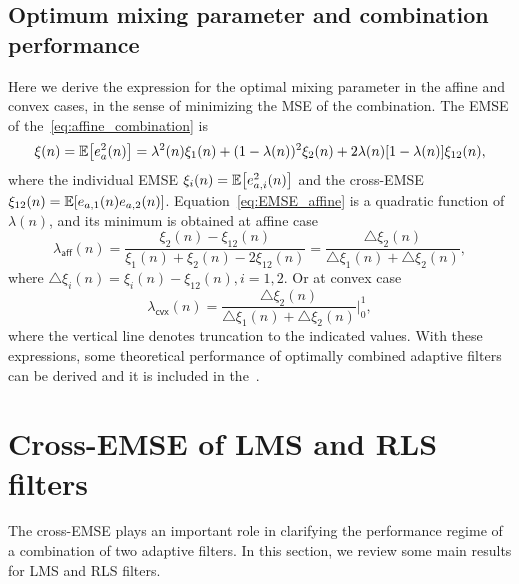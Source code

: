 \documentclass[11pt]{article}
\begin{document}
\subsection{Optimum mixing parameter and combination performance}
Here we derive the expression for the optimal mixing parameter in the affine and convex cases, in the sense of minimizing the MSE of the combination.
The EMSE of the~\cref{eq:affine_combination} is
\begin{equation}\label{eq:EMSE_affine}
    \xi(n)= \E{e_a^2(n)} =
    \lambda^2(n)\xi_1(n)+(1-\lambda(n))^2\xi_2(n)+2\lambda(n)[1-\lambda(n)]\xi_{12}(n),
\end{equation}
where the individual EMSE $\xi_i(n)=\E{e_{a,i}^2(n)}$ and the cross-EMSE $\xi_{12}(n)=\E{e_{a,1}(n)e_{a,2}(n)}$.
Equation~\eqref{eq:EMSE_affine} is a quadratic function of $\lambda(n)$, and its minimum is obtained at affine case
\begin{equation}
    \lambda_{\mathsf{aff}}(n)=\frac{\xi_2(n)-\xi_{12}(n)}{\xi_1(n)+\xi_2(n)-2\xi_{12}(n)} = \frac{\triangle\xi_2(n)}{\triangle\xi_1(n)+\triangle\xi_{2}(n)},
\end{equation}
where $\triangle\xi_i(n)=\xi_i(n)-\xi_{12}(n), i=1,2$.
Or at convex case
\begin{equation}
    \lambda_{\mathsf{cvx}}(n)=\frac{\triangle\xi_2(n)}{\triangle\xi_1(n)+\triangle\xi_{2}(n)}\bigg\rvert_0^1,
\end{equation}
where the vertical line denotes truncation to the indicated values.
With these expressions, some theoretical performance of optimally combined adaptive filters can be derived and it is included in the~\cite{Arenas_Garcia_2016}.

\section{Cross-EMSE of LMS and RLS filters}
The cross-EMSE plays an important role in clarifying the performance regime of a combination of two adaptive filters. In this section, we review some main results for LMS and RLS filters.
\end{document}
